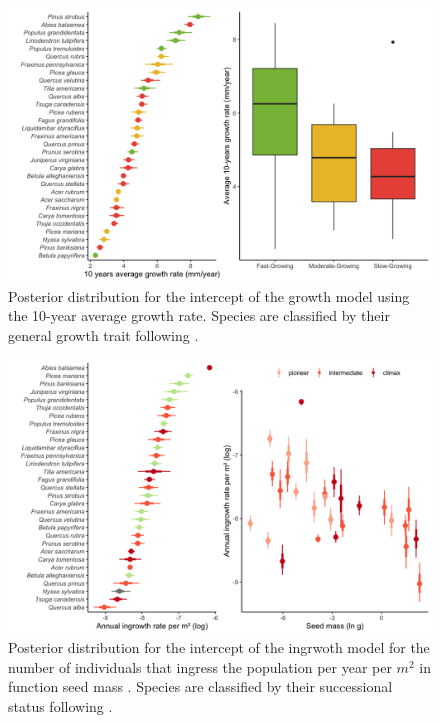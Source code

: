 \hypertarget{fig:figsupp2_ch2}{%
\begin{figure}
\centering
\includegraphics{manuscript/figs/fig-intGrowth-1.png}
\caption[{Posterior distribution for the intercept of the growth model
using the 10-year average growth rate.}]{Posterior distribution for the
intercept of the growth model using the 10-year average growth rate.
Species are classified by their general growth trait following
\citet{burns1990silvics}.}
\label{fig:figsupp2_ch2}
\end{figure}
}

\newpage

\hypertarget{fig:figsupp3_ch2}{%
\begin{figure}
\centering
\includegraphics{manuscript/figs/fig-intcerpt_ingrowth-1.png}
\caption[{Posterior distribution for the intercept of the ingrwoth model
for the number of individuals that ingress the population per year per
\(m^2\) in function seed mass \citep{diaz2022}.}]{Posterior distribution
for the intercept of the ingrwoth model for the number of individuals
that ingress the population per year per \(m^2\) in function seed mass
\citep{diaz2022}. Species are classified by their successional status
following \citet{burns1990silvics}.}
\label{fig:figsupp3_ch2}
\end{figure}
}

